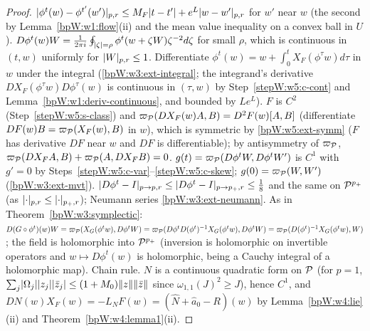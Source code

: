 \begin{proof}
\label{stepW:w5:c-cont} $\lvert \phi^t(w)-\phi^{t'}(w')\rvert_{p,r}\le M_F\lvert t-t'\rvert+e^{L}\lvert w-w'\rvert_{p,r}$ for
$w'$ near $w$ (the second by Lemma~\ref{bpW:w1:flow}(ii) and the mean value inequality on a convex ball in $U$).
$D\phi^t(w)W=\frac1{2\pi i}\oint_{\lvert \zeta\rvert=\rho}\phi^t(w+\zeta W)\zeta^{-2}d\zeta$ for small $\rho$, which is continuous in
$(t,w)$ uniformly for $\lvert W\rvert_{p,r}\le1$.
\label{stepW:w5:c-var} Differentiate $\phi^t(w)=w+\int_0^tX_F(\phi^\tau w)d\tau$ in $w$
under the integral (\ref{bpW:w3:ext-integral}; the integrand's derivative $DX_F(\phi^\tau w)D\phi^\tau(w)$ is continuous
in $(\tau,w)$ by Step~\ref{stepW:w5:c-cont} and Lemma~\ref{bpW:w1:deriv-continuous}, and bounded by $Le^L$).
\label{stepW:w5:c-skew} $F$ is $C^2$ (Step~\ref{stepW:w5:s-class}) and
$\varpi_{\mathcal P}(DX_F(w)A,B)=D^2F(w)[A,B]$ (differentiate $DF(w)B=\varpi_{\mathcal P}(X_F(w),B)$ in $w$), which is symmetric by
\ref{bpW:w5:ext-symm} ($F$ has derivative $DF$ near $w$ and $DF$ is differentiable); by antisymmetry
of $\varpi_{\mathcal P}$, $\varpi_{\mathcal P}(DX_FA,B)+\varpi_{\mathcal P}(A,DX_FB)=0$.
\label{stepW:w5:c-symp} $g(t)=\varpi_{\mathcal P}(D\phi^tW,D\phi^tW')$ is $C^1$ with $g'=0$ by
Steps~\ref{stepW:w5:c-var}--\ref{stepW:w5:c-skew}; $g(0)=\varpi_{\mathcal P}(W,W')$ (\ref{bpW:w3:ext-mvt}).
\label{stepW:w5:c-inv} $\lvert D\phi^t-I\rvert_{p\to p,r}\le\lvert D\phi^t-I\rvert_{p\to p_+,r}\le\frac18$ and the
same on $\mathcal P^{p_+}$ (as $\lvert \cdot\rvert_{p,r}\le\lvert \cdot\rvert_{p_+,r}$); Neumann series \ref{bpW:w3:ext-neumann}.
\label{stepW:w5:c-trans} As in Theorem~\ref{bpW:w3:symplectic}:
$D(G\circ\phi^t)(w)W=\varpi_{\mathcal P}(X_G(\phi^tw),D\phi^tW)=\varpi_{\mathcal P}(D\phi^tD(\phi^t)^{-1}X_G(\phi^tw),D\phi^tW)=\varpi_{\mathcal P}(D(\phi^t)^{-1}X_G(\phi^tw),W)$;
the field is holomorphic into $\mathcal P^{p_+}$ (inversion is holomorphic on invertible operators and $w\mapsto D\phi^t(w)$
is holomorphic, being a Cauchy integral of a holomorphic map).
\label{stepW:w5:c-time} Chain rule. $N$ is a continuous quadratic form on $\mathcal P$ (for $p=1$,
$\sum_j\lvert \Omega_j\rvert\lvert z_j\rvert\lvert \bar z_j\rvert\le(1+M_0)\lVert z\rVert\lVert \bar z\rVert$ since $\omega_{1,1}(J)^2\ge J$), hence $C^1$, and
$DN(w)X_F(w)=-L_NF(w)=(\hat N+\hat a_0-R)(w)$ by Lemma~\ref{bpW:w4:lie}(ii) and Theorem~\ref{bpW:w4:lemma1}(ii).
\end{proof}

